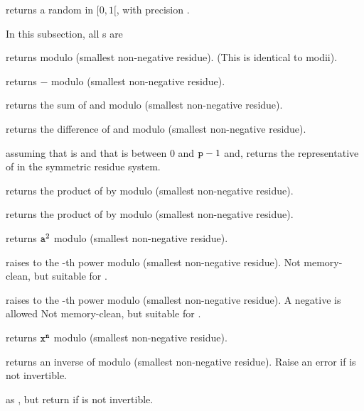  returns a random  in $[0,1[$, with
precision .

 In this subsection, all s are 

 returns  modulo  (smallest
non-negative residue). (This is identical to modii).

 returns $-$ modulo  (smallest
non-negative residue).

 returns the sum of  and
 modulo  (smallest non-negative residue).

 returns the difference of  and
 modulo  (smallest non-negative residue).

 assuming that  is
 and that  is between $0$ and ${\tt p} - 1$ and,
returns the representative of  in the symmetric residue system.

 returns the product of  by
 modulo  (smallest non-negative residue).

 returns the product of  by
 modulo  (smallest non-negative residue).

 returns ${\tt a}^2$ modulo  (smallest
non-negative residue).

 raises  to the -th
power modulo  (smallest non-negative residue). Not memory-clean, but
suitable for .

 raises  to the -th
power modulo  (smallest non-negative residue). A negative  is
allowed Not memory-clean, but suitable for .

 returns ${\tt x}^{\tt n}$
modulo  (smallest non-negative residue).

 returns an inverse of  modulo 
(smallest non-negative residue). Raise an error if  is not invertible.

 as , but return
 if  is not invertible.

